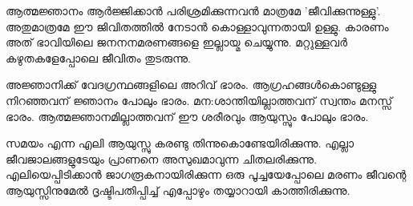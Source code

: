 ആത്മജ്ഞാനം ആര്‍ജ്ജിക്കാന്‍ പരിശ്രമിക്കുന്നവന്‍ മാത്രമേ 'ജീവിക്കുന്നുള്ളു'. അതുമാത്രമേ ഈ ജിവിതത്തില്‍ നേടാന്‍ കൊള്ളാവുന്നതായി ഉള്ളു. കാരണം അത്‌ ഭാവിയിലെ ജനനനമരണങ്ങളെ ഇല്ലായ്മ ചെയ്യുന്നു. മറ്റുള്ളവര്‍ കഴുതകളേപ്പോലെ ജീവിതം തുടരുന്നു. 

അജ്ഞാനിക്ക്‌ വേദഗ്രന്ഥങ്ങളിലെ അറിവ്‌ ഭാരം.
ആഗ്രഹങ്ങള്‍കൊണ്ടുള്ളു നിറഞ്ഞവന്‌ ജ്ഞാനം പോലും ഭാരം.
മന:ശാന്തിയില്ലാത്തവന്‌ സ്വന്തം മനസ്സ്‌ ഭാരം.
ആത്മജ്ഞാനമില്ലാത്തവന്‌ ഈ ശരീരവും ആയുസ്സും പോലും ഭാരം.

സമയം എന്ന എലി ആയുസ്സു കരണ്ടു തിന്നുകൊണ്ടേയിരിക്കുന്നു. എല്ലാ ജീവജാലങ്ങളുടേയും പ്രാണനെ അസുഖമാവുന്ന ചിതലരിക്കുന്നു. എലിയെപ്പിടിക്കാന്‍ ജാഗരൂകനായിരിക്കുന്ന ഒരു പൂച്ചയേപ്പോലെ മരണം ജീവന്റെ ആയുസ്സിനുമേല്‍ ദൃഷ്ടിപതിപ്പിച്ച്‌ എപ്പോഴും തയ്യാറായി കാത്തിരിക്കുന്നു. 
